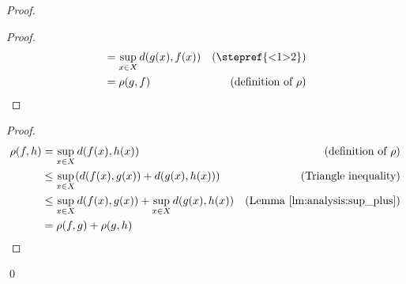 \begin{proof}
\begin{proof}
\begin{align*}
      & = \sup_{x \in X} d(g(x), f(x)) & (\text{\stepref{<1>2}}) \\
      & = \rho(g, f) & (\text{definition of } \rho)
    \end{align*}
  \end{proof}
  \begin{proof}
    \pf
    \begin{align*}
      \rho(f,h) & = \sup_{x \in X} d(f(x), h(x)) & (\text{definition of } \rho) \\
      & \leq \sup_{x \in X} (d(f(x), g(x)) + d(g(x), h(x))) &
        (\text{Triangle inequality})\\
      & \leq \sup_{x \in X} d(f(x), g(x)) + \sup_{x \in X} d(g(x), h(x)) & (\text{Lemma \ref{lm:analysis:sup_plus}}) \\
      & = \rho(f,g) + \rho(g,h)
    \end{align*}
  \end{proof}
  \qed
\end{proof}

